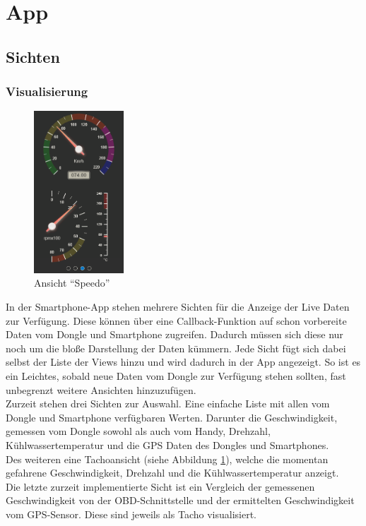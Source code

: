 \section{App}

\subsection{Sichten}

\subsubsection{Visualisierung}
\label{sec:appSichtAnzeige}

\begin{figure}
  \begin{center}
	\includegraphics[width=0.3\textwidth]{./img/App_Speedo}
	\caption{Ansicht \enquote{Speedo}}
	\label{fig:App_Speedo}
  \end{center}
\end{figure}

In der Smartphone-App stehen mehrere Sichten für die Anzeige der Live Daten zur Verfügung. Diese können über eine Callback-Funktion auf schon vorbereite Daten vom Dongle und Smartphone zugreifen. Dadurch müssen sich diese nur noch um die bloße Darstellung der Daten kümmern. Jede Sicht fügt sich dabei selbst der Liste der Views hinzu und wird dadurch in der App angezeigt. So ist es ein Leichtes, sobald neue Daten vom Dongle zur Verfügung stehen sollten, fast unbegrenzt weitere Ansichten hinzuzufügen.
\\
Zurzeit stehen drei Sichten zur Auswahl. Eine einfache Liste mit allen vom Dongle und Smartphone verfügbaren Werten. Darunter die Geschwindigkeit, gemessen vom Dongle sowohl als auch vom Handy, Drehzahl, Kühlwassertemperatur und die GPS Daten des Dongles und Smartphones.
\\
Des weiteren eine Tachoansicht (siehe Abbildung \ref{fig:App_Speedo}), welche die momentan gefahrene Geschwindigkeit, Drehzahl und die Kühlwassertemperatur anzeigt.
\\
Die letzte zurzeit implementierte Sicht ist ein Vergleich der gemessenen Geschwindigkeit von der OBD-Schnittstelle und der ermittelten Geschwindigkeit vom GPS-Sensor. Diese sind jeweils als Tacho visualisiert.

